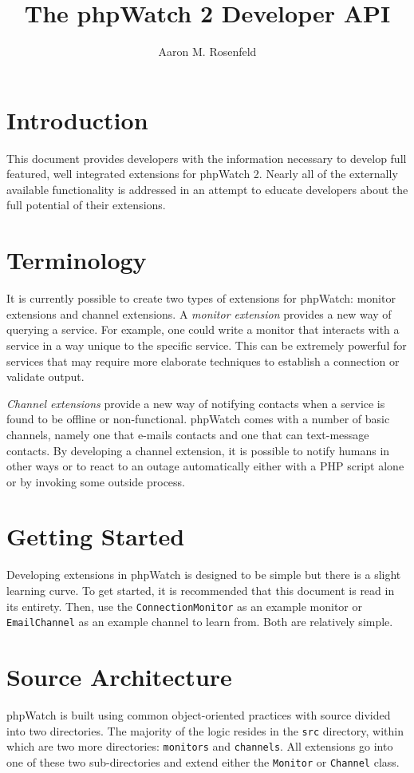 \documentclass[10pt]{article}
\title{The phpWatch 2 Developer API}
\author{Aaron M. Rosenfeld}
\begin{document}
\maketitle

\section{Introduction}
This document provides developers with the information necessary to develop full featured, well integrated extensions for
phpWatch 2.  Nearly all of the externally available functionality is addressed in an attempt to educate developers about
the full potential of their extensions.

\section{Terminology}
It is currently possible to create two types of extensions for phpWatch: monitor extensions and channel extensions.  A
\emph{monitor extension} provides a new way of querying a service.  For example, one could write a monitor that interacts with
a service in a way unique to the specific service.  This can be extremely powerful for services that may require more
elaborate techniques to establish a connection or validate output.

\emph{Channel extensions} provide a new way of notifying contacts when a service is found to be offline or
non-functional.  phpWatch comes with a number of basic channels, namely one that e-mails contacts and one that can
text-message contacts.  By developing a channel extension, it is possible to notify humans in other ways or to react to
an outage automatically either with a PHP script alone or by invoking some outside process.

\section{Getting Started}
Developing extensions in phpWatch is designed to be simple but there is a slight learning curve.  To get started, it is
recommended that this document is read in its entirety.  Then, use the \texttt{ConnectionMonitor} as an example monitor
or \texttt{EmailChannel} as an example channel to learn from.  Both are relatively simple.

\section{Source Architecture}
phpWatch is built using common object-oriented practices with source divided into two directories.  The majority of the
logic resides in the \texttt{src} directory, within which are two more directories: \texttt{monitors} and
\texttt{channels}.  All extensions go into one of these two sub-directories and extend either the \texttt{Monitor} or
\texttt{Channel} class.
\end{document}
